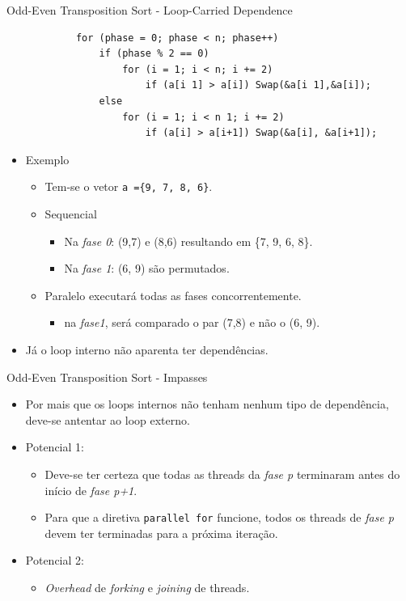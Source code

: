 	\begin{frame}[fragile]{Odd-Even Transposition Sort - Loop-Carried Dependence}
		\begin{verbatim}
			for (phase = 0; phase < n; phase++) 
				if (phase % 2 == 0)
					for (i = 1; i < n; i += 2)
						if (a[i 1] > a[i]) Swap(&a[i 1],&a[i]); 
				else
					for (i = 1; i < n 1; i += 2)
						if (a[i] > a[i+1]) Swap(&a[i], &a[i+1]);
		\end{verbatim}
		\begin{itemize}
			\item Exemplo
			\begin{itemize}
				\item Tem-se o vetor {\tt a =\{9, 7, 8, 6\}}. 
				\item Sequencial
				\begin{itemize}
					\item Na \textit{fase 0}: (9,7) e (8,6) resultando em \{7, 9, 6, 8\}.
					\item Na \textit{fase 1}: (6, 9) são permutados.
				\end{itemize}
				\item Paralelo executará todas as fases concorrentemente.
				\begin{itemize}
					\item na \textit{fase1}, será comparado o par (7,8) e não o (6, 9).
				\end{itemize}
			\end{itemize}
			\bigskip
			\item Já o loop interno não aparenta ter dependências.
		\end{itemize}
\end{frame}


			
	\begin{frame}{Odd-Even Transposition Sort - Impasses}
		\begin{itemize}
			\item Por mais que os loops internos não tenham nenhum tipo de dependência, deve-se antentar ao loop externo.
			\item Potencial 1:
			\begin{itemize}
				\item Deve-se ter certeza que todas as threads da \textit{fase p} terminaram antes do início de \textit{fase p+1}.
				\item Para que a diretiva {\tt parallel for} funcione, todos os threads de \textit{fase p} devem ter terminadas para a próxima iteração.
			\end{itemize}
			\item Potencial 2:
			\begin{itemize}
				\item \textit{Overhead} de \textit{forking} e \textit{joining} de threads.
			\end{itemize}
		\end{itemize}
	\end{frame}




